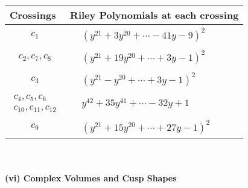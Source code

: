 \documentclass[1p]{elsarticle_modified}
\theoremstyle{definition}
\begin{document}
\begin{tabular}{m{50pt}|m{274pt}}
Crossings & \hspace{64pt}Riley Polynomials at each crossing \\
\hline $$\begin{aligned}c_{1}\end{aligned}$$&$\begin{aligned}
&(y^{21}+3 y^{20}+\cdots-41 y-9)^{2}
\end{aligned}$\\
\hline $$\begin{aligned}c_{2},c_{7},c_{8}\end{aligned}$$&$\begin{aligned}
&(y^{21}+19 y^{20}+\cdots+3 y-1)^{2}
\end{aligned}$\\
\hline $$\begin{aligned}c_{3}\end{aligned}$$&$\begin{aligned}
&(y^{21}- y^{20}+\cdots+3 y-1)^{2}
\end{aligned}$\\
\hline $$\begin{aligned}c_{4},c_{5},c_{6}\\c_{10},c_{11},c_{12}\end{aligned}$$&$\begin{aligned}
&y^{42}+35 y^{41}+\cdots-32 y+1
\end{aligned}$\\
\hline $$\begin{aligned}c_{9}\end{aligned}$$&$\begin{aligned}
&(y^{21}+15 y^{20}+\cdots+27 y-1)^{2}
\end{aligned}$\\
\hline
\end{tabular}\\~\\
\newpage\flushleft \textbf{(vi) Complex Volumes and Cusp Shapes}
\end{document}
